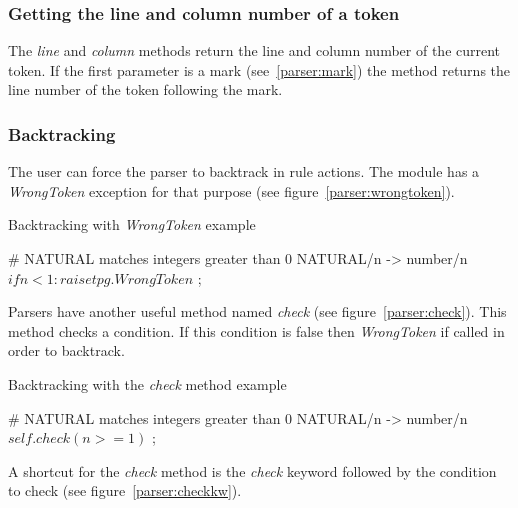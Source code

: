 
\subsubsection{Getting the line and column number of a token}

The \emph{line} and \emph{column} methods return the line and column number of the current token.
If the first parameter is a mark (see~\ref{parser:mark}) the method returns the line number of the token following the mark.

\subsubsection{Backtracking}

The user can force the parser to backtrack in rule actions.
The module has a \emph{WrongToken} exception for that purpose (see figure~\ref{parser:wrongtoken}).

\begin{code}
\caption{Backtracking with \emph{WrongToken} example}           \label{parser:wrongtoken}
\begin{verbatimtab}[4]
    # NATURAL matches integers greater than 0
    NATURAL/n ->
        number/n
        $ if n<1: raise tpg.WrongToken $
        ;
\end{verbatimtab}
\end{code}

Parsers have another useful method named \emph{check} (see figure~\ref{parser:check}).
This method checks a condition.
If this condition is false then \emph{WrongToken} if called in order to backtrack.

\begin{code}
\caption{Backtracking with the \emph{check} method example}     \label{parser:check}
\begin{verbatimtab}[4]
    # NATURAL matches integers greater than 0
    NATURAL/n ->
        number/n
        $ self.check(n>=1) $
        ;
\end{verbatimtab}
\end{code}

A shortcut for the \emph{check} method is the \emph{check} keyword followed by the condition to check (see figure~\ref{parser:checkkw}).

